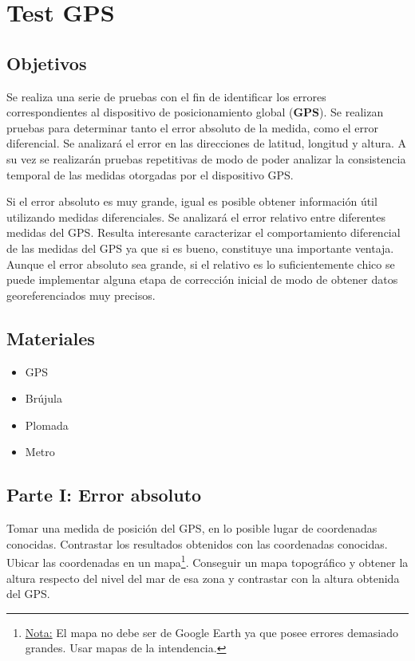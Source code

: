 \documentclass[spanish,12pt,a4paper,titlepage]{report}
\begin{document}
\chapter{Test GPS}

\section{Objetivos}

Se realiza una serie de pruebas con el fin de identificar los errores correspondientes al dispositivo de posicionamiento global (\textbf{GPS}). Se realizan pruebas para determinar tanto el error absoluto de la medida, como el error diferencial. Se analizará el error en las direcciones de latitud, longitud y altura. A su vez se realizarán pruebas repetitivas de modo de poder analizar la consistencia temporal de las medidas otorgadas por el dispositivo GPS.

Si el error absoluto es muy grande, igual es posible obtener información útil utilizando medidas diferenciales. Se analizará el error relativo entre diferentes medidas del GPS. Resulta interesante caracterizar el comportamiento diferencial de las medidas del GPS ya que si es bueno, constituye una importante ventaja. Aunque el error absoluto sea grande, si el relativo es lo suficientemente chico se puede implementar alguna etapa de corrección inicial de modo de obtener datos georeferenciados muy precisos.\\

\section{Materiales}
\begin{itemize}
\item GPS
\item Brújula
\item Plomada
\item Metro
\end{itemize}

\section{Parte I: Error absoluto}
Tomar una medida de posición del GPS, en lo posible lugar de coordenadas conocidas. Contrastar los resultados obtenidos con las coordenadas conocidas. Ubicar las coordenadas en un mapa\footnote{\underline{Nota:} El mapa no debe ser de Google Earth ya que posee errores demasiado grandes. Usar mapas de la intendencia.}. Conseguir un mapa topográfico y obtener la altura respecto del nivel del mar de esa zona y contrastar con la altura obtenida del GPS. \\
\end{document}
